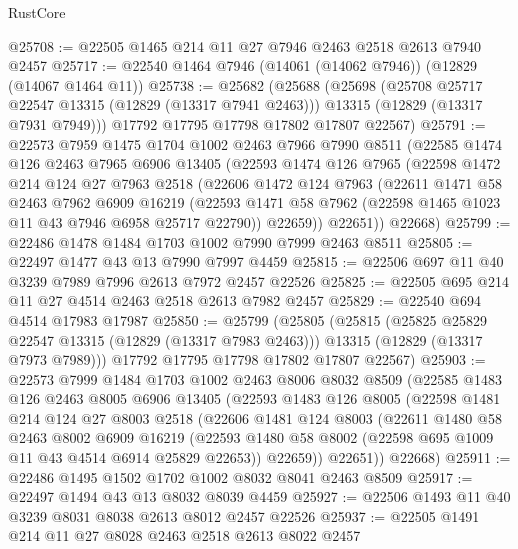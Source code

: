 \begin{lexlean}{RustCore}
\begin{coremodule}
@25708 := @22505 @1465 @214 @11 @27 @7946 @2463 @2518 @2613 @7940 @2457
@25717 := @22540 @1464 @7946 (@14061 (@14062 @7946)) (@12829 (@14067 @1464 @11))
@25738 := @25682
    (@25688
      (@25698
        (@25708 @25717 @22547 @13315 (@12829 (@13317 @7941 @2463)))
        @13315
        (@12829 (@13317 @7931 @7949)))
      @17792
      @17795
      @17798
      @17802
      @17807
      @22567)
@25791 := @22573
    @7959
    @1475
    @1704
    @1002
    @2463
    @7966
    @7990
    @8511
    (@22585
      @1474
      @126
      @2463
      @7965
      @6906
      @13405
      (@22593
        @1474
        @126
        @7965
        (@22598
          @1472
          @214
          @124
          @27
          @7963
          @2518
          (@22606
            @1472
            @124
            @7963
            (@22611
              @1471
              @58
              @2463
              @7962
              @6909
              @16219
              (@22593 @1471 @58 @7962 (@22598 @1465 @1023 @11 @43 @7946 @6958 @25717 @22790))
              @22659))
          @22651))
      @22668)
@25799 := @22486 @1478 @1484 @1703 @1002 @7990 @7999 @2463 @8511
@25805 := @22497 @1477 @43 @13 @7990 @7997 @4459
@25815 := @22506 @697 @11 @40 @3239 @7989 @7996 @2613 @7972 @2457 @22526
@25825 := @22505 @695 @214 @11 @27 @4514 @2463 @2518 @2613 @7982 @2457
@25829 := @22540 @694 @4514 @17983 @17987
@25850 := @25799
    (@25805
      (@25815
        (@25825 @25829 @22547 @13315 (@12829 (@13317 @7983 @2463)))
        @13315
        (@12829 (@13317 @7973 @7989)))
      @17792
      @17795
      @17798
      @17802
      @17807
      @22567)
@25903 := @22573
    @7999
    @1484
    @1703
    @1002
    @2463
    @8006
    @8032
    @8509
    (@22585
      @1483
      @126
      @2463
      @8005
      @6906
      @13405
      (@22593
        @1483
        @126
        @8005
        (@22598
          @1481
          @214
          @124
          @27
          @8003
          @2518
          (@22606
            @1481
            @124
            @8003
            (@22611
              @1480
              @58
              @2463
              @8002
              @6909
              @16219
              (@22593 @1480 @58 @8002 (@22598 @695 @1009 @11 @43 @4514 @6914 @25829 @22653))
              @22659))
          @22651))
      @22668)
@25911 := @22486 @1495 @1502 @1702 @1002 @8032 @8041 @2463 @8509
@25917 := @22497 @1494 @43 @13 @8032 @8039 @4459
@25927 := @22506 @1493 @11 @40 @3239 @8031 @8038 @2613 @8012 @2457 @22526
@25937 := @22505 @1491 @214 @11 @27 @8028 @2463 @2518 @2613 @8022 @2457

\end{coremodule}
\end{lexlean}
